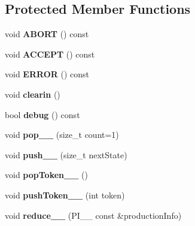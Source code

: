 \subsection*{Protected Member Functions}
\begin{DoxyCompactItemize}
\item 
\hypertarget{classParserBase_ad6b71fd0351cb81b3e07330ca4e7f6d8}{void {\bfseries A\+B\+O\+R\+T} () const }\label{classParserBase_ad6b71fd0351cb81b3e07330ca4e7f6d8}

\item 
\hypertarget{classParserBase_a4f4472657c7ac4798c3702fa8bd67014}{void {\bfseries A\+C\+C\+E\+P\+T} () const }\label{classParserBase_a4f4472657c7ac4798c3702fa8bd67014}

\item 
\hypertarget{classParserBase_a9fea7d8df0d5622042a9a1b2471ba276}{void {\bfseries E\+R\+R\+O\+R} () const }\label{classParserBase_a9fea7d8df0d5622042a9a1b2471ba276}

\item 
\hypertarget{classParserBase_a333e48ce916920ddcb0cb0000e7daacc}{void {\bfseries clearin} ()}\label{classParserBase_a333e48ce916920ddcb0cb0000e7daacc}

\item 
\hypertarget{classParserBase_ad3a3016e22c3ed0d41dda12b78d4cf51}{bool {\bfseries debug} () const }\label{classParserBase_ad3a3016e22c3ed0d41dda12b78d4cf51}

\item 
\hypertarget{classParserBase_ad00f3d17fe3f11ca3bcfbe025657fa8f}{void {\bfseries pop\+\_\+\+\_\+} (size\+\_\+t count=1)}\label{classParserBase_ad00f3d17fe3f11ca3bcfbe025657fa8f}

\item 
\hypertarget{classParserBase_af75b120cfb82005a308eaa421c835855}{void {\bfseries push\+\_\+\+\_\+} (size\+\_\+t next\+State)}\label{classParserBase_af75b120cfb82005a308eaa421c835855}

\item 
\hypertarget{classParserBase_a5d0072a7c7618681d52ac00451f4ccaa}{void {\bfseries pop\+Token\+\_\+\+\_\+} ()}\label{classParserBase_a5d0072a7c7618681d52ac00451f4ccaa}

\item 
\hypertarget{classParserBase_abcda272cb7ab1a2c0de7a7387963529a}{void {\bfseries push\+Token\+\_\+\+\_\+} (int token)}\label{classParserBase_abcda272cb7ab1a2c0de7a7387963529a}

\item 
\hypertarget{classParserBase_af4b7dba2ed61708384e53329e7a3796e}{void {\bfseries reduce\+\_\+\+\_\+} (P\+I\+\_\+\+\_\+ const \&production\+Info)}\label{classParserBase_af4b7dba2ed61708384e53329e7a3796e}


\end{DoxyCompactItemize}
